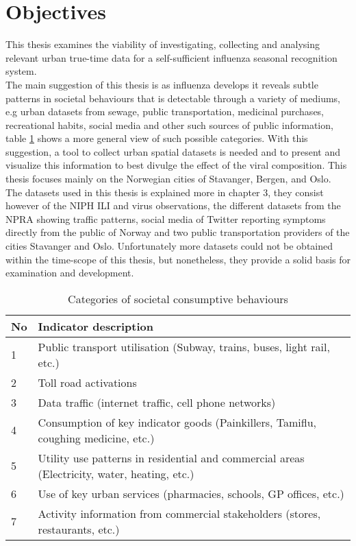 \section{Objectives}
This thesis examines the viability of investigating, collecting and analysing relevant urban true-time data for a self-sufficient influenza seasonal recognition system.\\
The main suggestion of this thesis is as influenza develops it reveals subtle patterns in societal behaviours that is detectable through a variety of mediums, e.g urban datasets from sewage, public transportation, medicinal purchases, recreational habits, social media and other such sources of public information, table \ref{table:2} shows a more general view of such possible categories. With this suggestion, a tool to collect urban spatial datasets is needed and to present and visualize this information to best divulge the effect of the viral composition. This thesis focuses mainly on the Norwegian cities of Stavanger, Bergen, and Oslo. The datasets used in this thesis is explained more in chapter 3, they consist however of the NIPH ILI and virus observations, the different datasets from the NPRA showing traffic patterns, social media of Twitter reporting symptoms directly from the public of Norway and two public transportation providers of the cities Stavanger and Oslo. Unfortunately more datasets could not be obtained within the time-scope of this thesis, but nonetheless, they provide a solid basis for examination and development.


\begin{table}[!htb]
\begin{tabular}{ | m{2em} | m{14cm}| }
 \hline
 \textbf{No} & \textbf{Indicator description} \\ [0.5ex] 
 \hline
 1 & Public transport utilisation (Subway, trains, buses, light rail, etc.) \\ 
  \hline
 2 & Toll road activations \\
  \hline
 3 & Data traffic (internet traffic, cell phone networks) \\
  \hline
 4 & Consumption of key indicator goods (Painkillers, Tamiflu, coughing medicine, etc.) \\
  \hline
 5 & Utility use patterns in residential and commercial areas (Electricity, water, heating, etc.) \\
 \hline
 6 & Use of key urban services (pharmacies, schools, GP offices, etc.) \\  
 \hline
 7 & Activity information from commercial stakeholders (stores, restaurants, etc.) \\ 
 \hline
\end{tabular}
 \caption{Categories of societal consumptive behaviours}
 \label{table:2}
\end{table}




